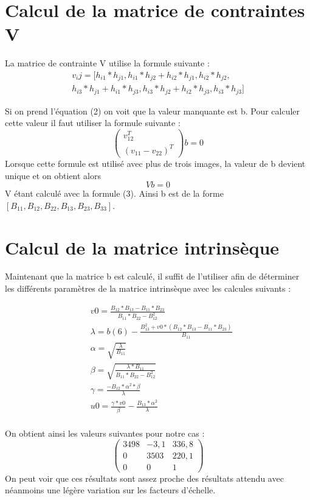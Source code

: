 \documentclass[a4paper,10pt]{article}
\begin{document}
\section{Calcul de la matrice de contraintes V}
La matrice de contrainte V utilise la formule suivante :
\begin{multline}
 v_ij = [h_{i1}*h_{j1}, h_{i1}*h_{j2} + h_{i2}*h_{j1}, h_{i2}*h_{j2},  \\
 h_{i3}*h_{j1} + h_{i1}*h_{j3}, h_{i3}*h_{j2} + h_{i2}*h_{j3}, h_{i3}*h_{j3}]
\end{multline}

Si on prend l'équation (2) on voit que la valeur manquante est b. Pour calculer cette valeur il faut
utiliser la formule suivante :
\begin{equation}
 \begin{pmatrix}v^T_{12}\\(v_{11}-v_{22})^T\end{pmatrix}b=0
\end{equation}
Lorsque cette formule est utilisé avec plus de trois images, la valeur de b devient unique et on obtient
alors $$Vb=0$$ V étant calculé avec la formule (3). Ainsi b est de la forme $[B_{11}, B_{12}, B_{22}, B_{13}, B_{23}, B_{33}]$.

\section{Calcul de la matrice intrinsèque}
Maintenant que la matrice b est calculé, il suffit de l'utiliser afin de déterminer les différents 
paramètres de la matrice intrinsèque avec les calcules suivants : 

\begin{align}
  &v0     = \frac{B_{12}*B_{13} - B_{11}*B_{23}}{B_{11}*B_{22} - B^2_{12}}\\
  &\lambda = b(6) - \frac{B^2_{13} + v0 * (B_{12} * B_{13} - B_{11} * B_{23})}{B_{11}}\\
  &\alpha  = \sqrt{\frac{\lambda}{B_{11}}}\\
  &\beta   = \sqrt{\frac{\lambda*B_{11}}{B_{11}*B_{22} - B^2_{12}}}\\
  &\gamma  = \frac{-B_{12}*\alpha^2*\beta}{\lambda}\\
  &u0     = \frac{\gamma *v0}{\beta} - \frac{B_{13}*\alpha^2}{\lambda}\\
\end{align}

On obtient ainsi les valeurs suivantes pour notre cas : 
$$\begin{pmatrix} 3498 & -3,1 & 336,8\\0 & 3503 & 220,1\\ 0 & 0 & 1\end{pmatrix}$$
On peut voir que ces résultats sont assez proche des résultats attendu avec néanmoins
une légère variation sur les facteurs d'échelle.
\end{document}
